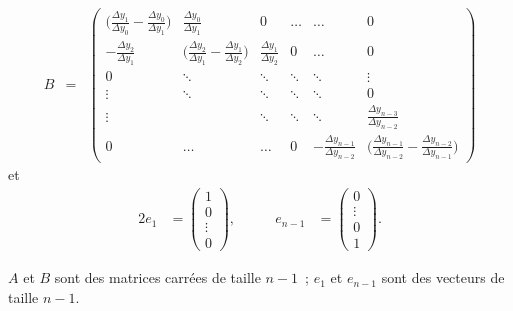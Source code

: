 \begin{eqnarray*}
B &=& \begin{pmatrix}
\biggl ( \frac{\Delta y_1}{\Delta y_0}-\frac{\Delta y_0}
{\Delta y_1}\biggr ) & \frac{\Delta y_0}{\Delta y_1} & 0 
& \ldots & \ldots & 0 \\
-\frac{\Delta y_2}{\Delta y_1} & \biggl ( \frac{\Delta y_2}
{\Delta y_1}-\frac{\Delta y_1}{\Delta y_2}\biggr ) & 
\frac{\Delta y_1}{\Delta y_2} & 0 & \ldots & 0 \\
0 & \ddots & \ddots & \ddots & \ddots & \vdots \\
\vdots & \ddots & \ddots & \ddots & \ddots & 0 \\
\vdots &  & \ddots & \ddots & \ddots & \frac{\Delta y_{n-3}}
{\Delta y_{n-2}}\\
0 & \ldots & \ldots & 0 & -\frac{\Delta y_{n-1}}{\Delta y_{n-2}} 
& \biggl ( \frac{\Delta y_{n-1}}{\Delta y_{n-2}}
-\frac{\Delta y_{n-2}}{\Delta y_{n-1}}\biggr )
\end{pmatrix}
\end{eqnarray*}
et
\begin{alignat*}{2}
e_1 &= \begin{pmatrix} 1\\0\\ \vdots \\0 \end{pmatrix}, 
&\qquad e_{n-1} &= \begin{pmatrix} 0\\ \vdots \\0\\1 \end{pmatrix}.
\end{alignat*}

\begin{Rem}
$A$ et $B$ sont des matrices carr\'ees de taille $n-1$~; $e_1$ et 
$e_{n-1}$ sont des vecteurs de taille $n-1$.
\end{Rem}

